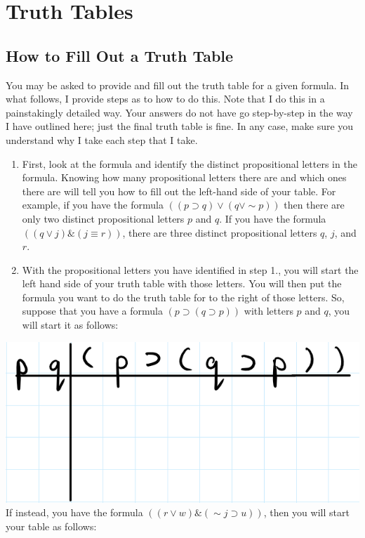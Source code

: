 \documentclass[
]{book}
\begin{document}
\hypertarget{truth-tables}{%
\chapter{Truth Tables}\label{truth-tables}}

\hypertarget{how-to-fill-out-a-truth-table}{%
\section{How to Fill Out a Truth Table}\label{how-to-fill-out-a-truth-table}}

You may be asked to provide and fill out the truth table for a given formula. In what follows, I provide steps as to how to do this. Note that I do this in a painstakingly detailed way. Your answers do not have go step-by-step in the way I have outlined here; just the final truth table is fine. In any case, make sure you understand why I take each step that I take.

\begin{enumerate}
\def\labelenumi{\arabic{enumi}.}
\item
  First, look at the formula and identify the distinct propositional letters in the formula. Knowing how many propositional letters there are and which ones there are will tell you how to fill out the left-hand side of your table. For example, if you have the formula \(((p \supset q) \lor (q \lor \sim p))\) then there are only two distinct propositional letters \(p\) and \(q\). If you have the formula \(((q \lor j) \& (j \equiv r))\), there are three distinct propositional letters \(q\), \(j\), and \(r\).
\item
  With the propositional letters you have identified in step 1., you will start the left hand side of your truth table with those letters. You will then put the formula you want to do the truth table for to the right of those letters. So, suppose that you have a formula \((p \supset (q \supset p))\) with letters \(p\) and \(q\), you will start it as follows:
\end{enumerate}

\includegraphics{Pictures/Week4Picture1.png}
If instead, you have the formula \(((r \lor w) \& (\sim j \supset u))\), then you will start your table as follows:
\end{document}
